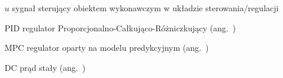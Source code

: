 \begin{itemize}
\item[$u$] sygnał sterujący obiektem wykonawczym w układzie sterowania/regulacji
\item[PID] regulator Proporcjonalno-Całkująco-Różniczkujący (ang.~)
\item[MPC] regulator oparty na modelu predykcyjnym (ang.~)
\item[DC] prąd stały (ang.~)
\end{itemize}